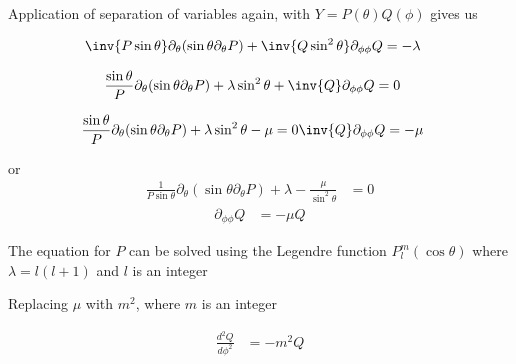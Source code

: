 Application of separation of variables again, with \(Y = P(\theta) Q(\phi)\) gives us

\begin{equation}\label{eqn:lecture5BigReviewAngularMomentum:5120}
\begin{aligned}
\inv{P \sin\theta} \partial_\theta (\sin\theta \partial_\theta P) + \inv{Q \sin^2\theta} \partial_{\phi\phi} Q &= -\lambda
\end{aligned}
\end{equation}

\begin{equation}\label{eqn:lecture5BigReviewAngularMomentum:5140}
\begin{aligned}
\frac{\sin\theta}{P } \partial_\theta (\sin\theta \partial_\theta P)
+\lambda  \sin^2\theta
+ \inv{Q } \partial_{\phi\phi} Q &= 0
\end{aligned}
\end{equation}

\begin{equation}\label{eqn:lecture5BigReviewAngularMomentum:5160}
\begin{aligned}
\frac{\sin\theta}{P } \partial_\theta (\sin\theta \partial_\theta P) + \lambda \sin^2\theta - \mu = 0
\inv{Q } \partial_{\phi\phi} Q &= -\mu
\end{aligned}
\end{equation}

or
\begin{equation}\label{eqn:PHY356F:1000}
\begin{aligned}
\frac{1}{P \sin\theta} \partial_\theta (\sin\theta \partial_\theta P) +\lambda -\frac{\mu}{\sin^2\theta} &= 0
\end{aligned}
\end{equation}
\begin{equation}\label{eqn:PHY356F:2000}
\begin{aligned}
\partial_{\phi\phi} Q &= -\mu Q
\end{aligned}
\end{equation}

The equation for \(P\) can be solved using the Legendre function \(P_l^m(\cos\theta)\) where \(\lambda = l(l+1)\) and \(l\) is an integer

Replacing \(\mu\) with \(m^2\), where \(m\) is an integer

\begin{equation}\label{eqn:lecture5BigReviewAngularMomentum:5180}
\begin{aligned}
\frac{d^2 Q}{d\phi^2} &= -m^2 Q
\end{aligned}
\end{equation}

